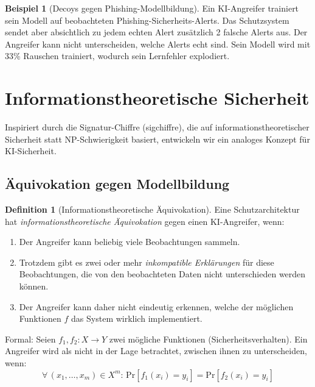 \documentclass[a4paper,12pt]{article}
\theoremstyle{definition}
\newtheorem{definition}{Definition}
\newtheorem{beispiel}{Beispiel}
\begin{document}
\begin{beispiel}[Decoys gegen Phishing-Modellbildung]
Ein KI-Angreifer trainiert sein Modell auf beobachteten Phishing-Sicherheits-Alerts. Das Schutzsystem sendet aber absichtlich zu jedem echten Alert zusätzlich 2 falsche Alerts aus. Der Angreifer kann nicht unterscheiden, welche Alerts echt sind. Sein Modell wird mit 33\% Rauschen trainiert, wodurch sein Lernfehler explodiert.
\end{beispiel}

\section{Informationstheoretische Sicherheit}

Inspiriert durch die Signatur-Chiffre (sigchiffre), die auf informationstheoretischer Sicherheit statt NP-Schwierigkeit basiert, entwickeln wir ein analoges Konzept für KI-Sicherheit.

\subsection{Äquivokation gegen Modellbildung}

\begin{definition}[Informationstheoretische Äquivokation]
\label{def:aequivokation}
Eine Schutzarchitektur hat \emph{informationstheoretische Äquivokation} gegen einen KI-Angreifer, wenn:
\begin{enumerate}
	\item Der Angreifer kann beliebig viele Beobachtungen sammeln.
	\item Trotzdem gibt es zwei oder mehr \emph{inkompatible Erklärungen} für diese Beobachtungen, die von den beobachteten Daten nicht unterschieden werden können.
	\item Der Angreifer kann daher nicht eindeutig erkennen, welche der möglichen Funktionen $f$ das System wirklich implementiert.
\end{enumerate}

Formal: Seien $f_1, f_2 : X \to Y$ zwei mögliche Funktionen (Sicherheitsverhalten). Ein Angreifer wird als nicht in der Lage betrachtet, zwischen ihnen zu unterscheiden, wenn:
\begin{equation}
\forall \, (x_1, \ldots, x_m) \in X^m : \, \mathrm{Pr}[f_1(x_i) = y_i] = \mathrm{Pr}[f_2(x_i) = y_i]
\end{equation}
\end{definition}
\end{document}
